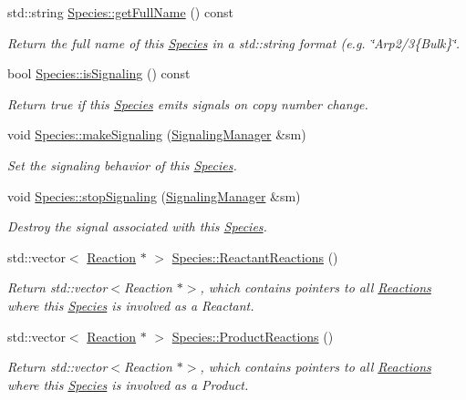\begin{DoxyCompactItemize}
std\-::string \hyperlink{group__Chemistry_ga121a9553f9e2018d7d51910b5d781316}{Species\-::get\-Full\-Name} () const 
\begin{DoxyCompactList}\small\item\em Return the full name of this \hyperlink{classSpecies}{Species} in a std\-::string format (e.\-g. \char`\"{}\-Arp2/3\{\-Bulk\}\char`\"{}. \end{DoxyCompactList}\item 
bool \hyperlink{group__Chemistry_ga8b801502dea3f30daf4494279cbda1c8}{Species\-::is\-Signaling} () const 
\begin{DoxyCompactList}\small\item\em Return true if this \hyperlink{classSpecies}{Species} emits signals on copy number change. \end{DoxyCompactList}\item 
void \hyperlink{group__Chemistry_ga188aa6fa6b7c84f4c740df869a46e263}{Species\-::make\-Signaling} (\hyperlink{classSignalingManager}{Signaling\-Manager} \&sm)
\begin{DoxyCompactList}\small\item\em Set the signaling behavior of this \hyperlink{classSpecies}{Species}. \end{DoxyCompactList}\item 
void \hyperlink{group__Chemistry_ga2f6bf3f11ba5ac49b3f542d8d5c7ffd3}{Species\-::stop\-Signaling} (\hyperlink{classSignalingManager}{Signaling\-Manager} \&sm)
\begin{DoxyCompactList}\small\item\em Destroy the signal associated with this \hyperlink{classSpecies}{Species}. \end{DoxyCompactList}\item 
std\-::vector$<$ \hyperlink{classReaction}{Reaction} $\ast$ $>$ \hyperlink{group__Chemistry_gab694c3af4b1470b26306776469cf1496}{Species\-::\-Reactant\-Reactions} ()
\begin{DoxyCompactList}\small\item\em Return std\-::vector$<$\-Reaction $\ast$$>$, which contains pointers to all \hyperlink{classReaction}{Reactions} where this \hyperlink{classSpecies}{Species} is involved as a Reactant. \end{DoxyCompactList}\item 
std\-::vector$<$ \hyperlink{classReaction}{Reaction} $\ast$ $>$ \hyperlink{group__Chemistry_ga2ebcfd154efba4ba0a881f89e3a0102c}{Species\-::\-Product\-Reactions} ()
\begin{DoxyCompactList}\small\item\em Return std\-::vector$<$\-Reaction $\ast$$>$, which contains pointers to all \hyperlink{classReaction}{Reactions} where this \hyperlink{classSpecies}{Species} is involved as a Product. \end{DoxyCompactList}\item 

\end{DoxyCompactItemize}
